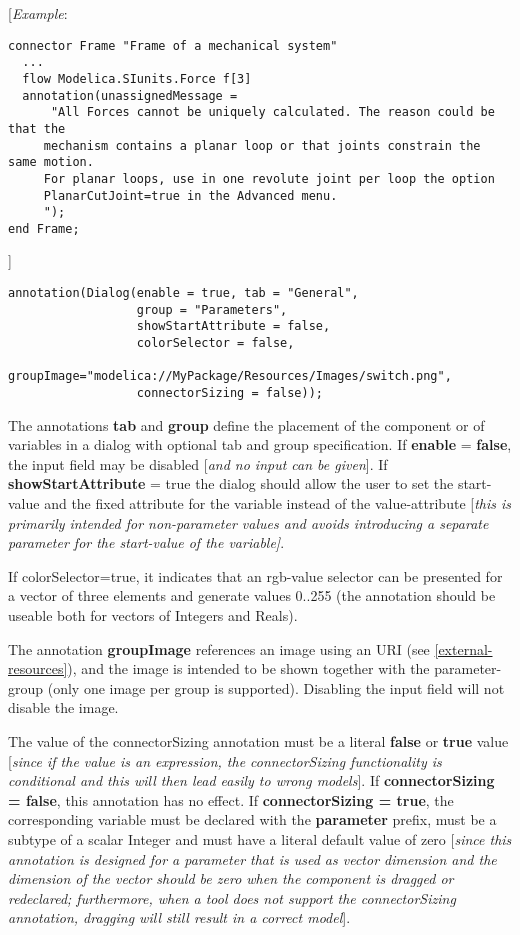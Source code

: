 {[}\emph{Example}:

\begin{lstlisting}[language=modelica]
connector Frame "Frame of a mechanical system"
  ...
  flow Modelica.SIunits.Force f[3]
  annotation(unassignedMessage =
      "All Forces cannot be uniquely calculated. The reason could be that the
     mechanism contains a planar loop or that joints constrain the same motion.
     For planar loops, use in one revolute joint per loop the option
     PlanarCutJoint=true in the Advanced menu.
     ");
end Frame;
\end{lstlisting}
{]}
\begin{lstlisting}[language=modelica]
annotation(Dialog(enable = true, tab = "General",
                  group = "Parameters",
                  showStartAttribute = false,
                  colorSelector = false,
                  groupImage="modelica://MyPackage/Resources/Images/switch.png",
                  connectorSizing = false));
\end{lstlisting}

The annotations \textbf{tab} and \textbf{group} define the placement of
the component or of variables in a dialog with optional tab and group
specification. If \textbf{enable} = \textbf{false}, the input field may
be disabled {[}\emph{and no input can be given}{]}. If
\textbf{showStartAttribute} = true the dialog should allow the user to
set the start-value and the fixed attribute for the variable instead of
the value-attribute {[}\emph{this is primarily intended for
non-parameter values and avoids introducing a separate parameter for the
start-value of the variable{]}}.

If colorSelector=true, it indicates that an rgb-value selector can be
presented for a vector of three elements and generate values 0..255 (the
annotation should be useable both for vectors of Integers and Reals).

The annotation \textbf{groupImage} references an image using an URI (see
\ref{external-resources}), and the image is intended to be shown together with the
parameter-group (only one image per group is supported). Disabling the
input field will not disable the image.

The value of the connectorSizing annotation must be a literal
\textbf{false} or \textbf{true} value {[}\emph{since if the value is an
expression, the connectorSizing functionality is conditional and this
will then lead easily to wrong models}{]}. If \textbf{connectorSizing =
false}, this annotation has no effect. If \textbf{connectorSizing =
true}, the corresponding variable must be declared with the
\textbf{parameter} prefix, must be a subtype of a scalar Integer and
must have a literal default value of zero {[}\emph{since this annotation
is designed for a parameter that is used as vector dimension and the
dimension of the vector should be zero when the component is dragged or
redeclared; furthermore, when a tool does not support the
connectorSizing annotation, dragging will still result in a correct
model}{]}.

